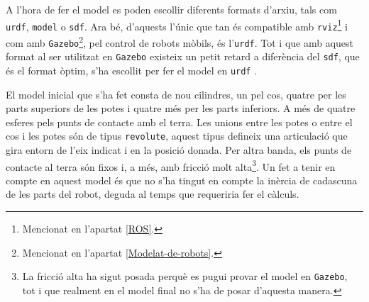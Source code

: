 \documentclass[12pt,a4paper,final,twoside]{article}
\begin{document}
A l'hora de fer el model es poden escollir diferents formats d'arxiu, tals com \texttt{urdf}, \texttt{model} o \texttt{sdf}. Ara bé, d'aquests l'únic que tan és compatible amb \texttt{rviz}\footnote{Mencionat en l'apartat \ref{ROS}.} i com amb \texttt{Gazebo}\footnote{Mencionat en l'apartat \ref{Modelat-de-robots}.}, pel control de robots mòbils, és l'\texttt{urdf}. Tot i que amb aquest format al ser utilitzat en \texttt{Gazebo} existeix un petit retard a diferència del \texttt{sdf}, que és el format òptim, s'ha escollit per fer el model en \texttt{urdf} \cite{Sucan}.

El model inicial que s'ha fet consta de nou cilindres, un pel cos, quatre per les parts superiors de les potes i quatre més per les parts inferiors. A més de quatre esferes pels punts de contacte amb el terra. Les unions entre les potes o entre el cos i les potes són de tipus \texttt{revolute}, aquest tipus defineix una articulació que gira entorn de l'eix indicat i en la posició donada. Per altra banda, els punts de contacte al terra són fixos i, a més, amb fricció molt alta\footnote{La fricció alta ha sigut posada perquè es pugui provar el model en \texttt{Gazebo}, tot i que realment en el model final no s'ha de posar d'aquesta manera.}. Un fet a tenir en compte en aquest model és que no s'ha tingut en compte la inèrcia de cadascuna de les parts del robot, deguda al temps que requeriria fer el càlculs. 
\end{document}
